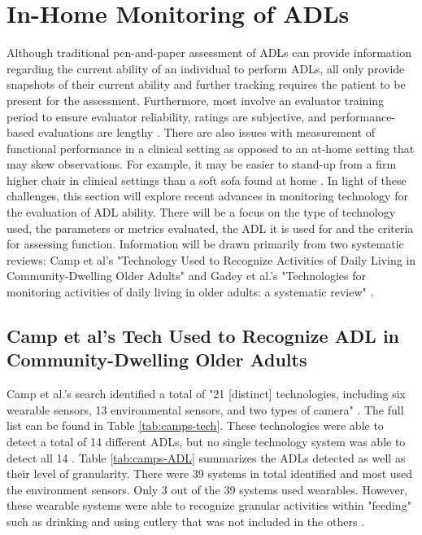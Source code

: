 \clearpage
\section{In-Home Monitoring of ADLs}
Although traditional pen-and-paper assessment of ADLs can provide information regarding the current ability of an individual to perform ADLs, all only provide snapshots of their current ability and further tracking requires the patient to be present for the assessment. Furthermore, most involve an evaluator training period to ensure evaluator reliability, ratings are subjective, and performance-based evaluations are lengthy \cite{noauthor_performance_2015,hall_functional_2014,bottari_iadl_2010,themes_texas_2017}. There are also issues with measurement of functional performance in a clinical setting as opposed to an at-home setting that may skew observations. For example, it may be easier to stand-up from a firm higher chair in clinical settings than a soft sofa found at home \cite{camp_technology_2021}. In light of these challenges, this section will explore recent advances in monitoring technology for the evaluation of ADL ability. There will be a focus on the type of technology used, the parameters or metrics evaluated, the ADL it is used for and the criteria for assessing function. Information will be drawn primarily from two systematic reviews: Camp et al's "Technology Used to Recognize Activities of Daily Living in Community-Dwelling Older Adults" \cite{camp_technology_2021} and Gadey et al.'s "Technologies for monitoring activities of daily living in older adults: a systematic review" \cite{gadey_technologies_2023}.

\subsection{Camp et al's Tech Used to Recognize ADL in Community-Dwelling Older Adults}
Camp et al.'s search identified a total of "21 [distinct] technologies, including six wearable sensors, 13 environmental sensors, and two types of camera" \cite{camp_technology_2021}. The full list can be found in Table \ref{tab:camps-tech}. These technologies were able to detect a total of 14 different ADLs, but no single technology system was able to detect all 14 \cite{camp_technology_2021}. Table \ref{tab:camps-ADL} summarizes the ADLs detected as well as their level of granularity. There were 39 systems in total identified and most used the environment sensors. Only 3 out of the 39 systems used wearables. However, these wearable systems were able to recognize granular activities within "feeding" such as drinking and using cutlery that was not included in the others \cite{camp_technology_2021}. 

